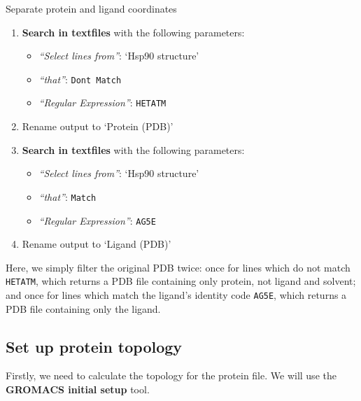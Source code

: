 \documentclass[twocolumn]{bmcart}%
\providecommand{\tightlist}{%
  \setlength{\itemsep}{0pt}\setlength{\parskip}{0pt}}
\begin{document}
\begin{handson_box_colour}{Separate protein and ligand coordinates}

\begin{enumerate}
\def\labelenumi{\arabic{enumi}.}
\tightlist
\item
  \textbf{Search in textfiles} with the following parameters:
  \begin{itemize}
  \tightlist
  \item
    \emph{``Select lines from''}: `Hsp90 structure'
  \item
    \emph{``that''}: \texttt{Don\textquotesingle{}t\ Match}
  \item
    \emph{``Regular Expression''}: \texttt{HETATM}
  \end{itemize}
\item
  Rename output to `Protein (PDB)'
\item
  \textbf{Search in textfiles} with the following parameters:

  \begin{itemize}
  \tightlist
  \item
    \emph{``Select lines from''}: `Hsp90 structure'
  \item
    \emph{``that''}: \texttt{Match}
  \item
    \emph{``Regular Expression''}: \texttt{AG5E}
  \end{itemize}
\item
  Rename output to `Ligand (PDB)'
\end{enumerate}

\end{handson_box_colour}

Here, we simply filter the original PDB twice: once for lines which do not match \texttt{HETATM}, which returns a PDB file containing only protein, not ligand and solvent; and once for lines which match the ligand's identity code \texttt{AG5E}, which returns a PDB file containing only the ligand.

\hypertarget{set-up-protein-topology}{%
\subsection*{Set up protein topology}\label{set-up-protein-topology}}

Firstly, we need to calculate the topology for the protein file. We will
use the \textbf{GROMACS initial setup} tool.
\end{document}
